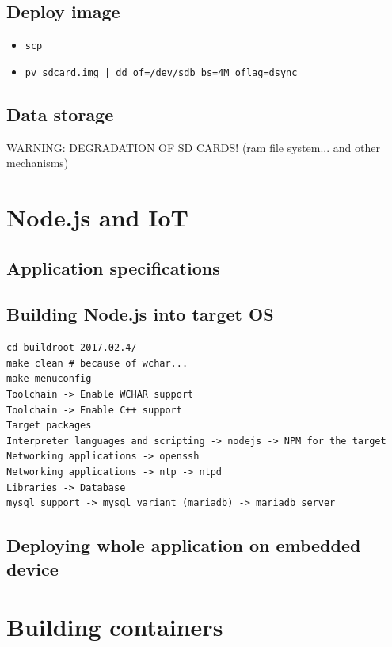 \documentclass[printmode]{mgr}
\begin{document}
\section{Deploy image}

\begin{itemize}
  \item \verb|scp|
  \item \verb!pv sdcard.img | dd of=/dev/sdb bs=4M oflag=dsync!
\end{itemize}



\section{Data storage}
WARNING: DEGRADATION OF SD CARDS! (ram file system... and other mechanisms)




\chapter{Node.js and IoT}


\section{Application specifications}

\section{Building Node.js into target OS}

\begin{lstlisting}
cd buildroot-2017.02.4/
make clean # because of wchar...
make menuconfig
Toolchain -> Enable WCHAR support
Toolchain -> Enable C++ support
Target packages
Interpreter languages and scripting -> nodejs -> NPM for the target
Networking applications -> openssh
Networking applications -> ntp -> ntpd
Libraries -> Database
mysql support -> mysql variant (mariadb) -> mariadb server
\end{lstlisting}

\section{Deploying whole application on embedded device}

\chapter{Building containers}
\end{document}
